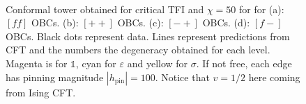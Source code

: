 \begin{figure}[h!]
		\hspace{-0.5cm}
		\begin{minipage}{\linewidth}
			\
		\end{minipage}
		\caption{Conformal tower obtained for critical TFI and $\chi=50$ for for (a): $[ff]$ OBCs. (b): $[++]$ OBCs. (c): $[-+]$ OBCs. (d): $[f-]$ OBCs. Black dots represent data. Lines represent predictions from CFT and the numbers the degeneracy obtained for each level. Magenta is for $\mathbb{1}$, cyan for $\varepsilon$ and yellow for $\sigma$. If not free, each edge has pinning magnitude $|h_\text{pin}|=100$. Notice that $v=1/2$ here coming from Ising CFT.}
		\label{fig:towersTFI}
	\end{figure}


